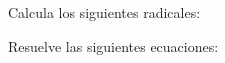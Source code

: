 \documentclass[spanish, 11pt]{exam}
\begin{document}
\begin{questions}
\begin{multicols}{3}
\begin{parts}
        \end{parts}
        \end{multicols}
        \question Calcula los siguientes radicales:
        \begin{multicols}{3} 
        \end{multicols}
        \question Resuelve las siguientes ecuaciones:
        \begin{multicols}{3} 

\end{multicols}
\end{questions}
\end{document}
